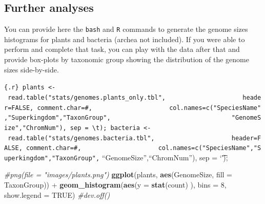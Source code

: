 \documentclass[10pt,a4paper,]{article}
\newenvironment{Shaded}{}{}
\newcommand{\CharTok}[1]{\textcolor[rgb]{0.25,0.44,0.63}{#1}}
\newcommand{\CommentTok}[1]{\textcolor[rgb]{0.38,0.63,0.69}{\textit{#1}}}
\newcommand{\DataTypeTok}[1]{\textcolor[rgb]{0.56,0.13,0.00}{#1}}
\newcommand{\DecValTok}[1]{\textcolor[rgb]{0.25,0.63,0.44}{#1}}
\newcommand{\KeywordTok}[1]{\textcolor[rgb]{0.00,0.44,0.13}{\textbf{#1}}}
\newcommand{\NormalTok}[1]{#1}
\newcommand{\OperatorTok}[1]{\textcolor[rgb]{0.40,0.40,0.40}{#1}}
\newcommand{\OtherTok}[1]{\textcolor[rgb]{0.00,0.44,0.13}{#1}}
\newcommand{\StringTok}[1]{\textcolor[rgb]{0.25,0.44,0.63}{#1}}
\begin{document}
\hypertarget{further-analyses}{%
\subsection{Further analyses}\label{further-analyses}}

You can provide here the \texttt{bash} and \texttt{R} commands to
generate the genome sizes histograms for plants and bacteria (archea not
included). If you were able to perform and complete that task, you can
play with the data after that and provide box-plots by taxonomic group
showing the distribution of the genome sizes side-by-side.

\begin{Shaded}
\end{Shaded}

\texttt{\{.r\}\ plants\ \textless{}-\ read.table("stats/genomes.plants\_only.tbl",\ \ \ \ \ \ \ \ \ \ \ \ \ \ \ \ \ \ \ \ \ header=FALSE,\ comment.char=\textquotesingle{}\#\textquotesingle{},\ \ \ \ \ \ \ \ \ \ \ \ \ \ \ \ \ \ \ \ \ col.names=c("SpeciesName","Superkingdom","TaxonGroup",\ \ \ \ \ \ \ \ \ \ \ \ \ \ \ \ \ \ \ \ \ \ \ \ \ \ \ \ \ \ \ \ \ "GenomeSize","ChromNum"),\ sep\ =\ \textquotesingle{}\textbackslash{}t\textquotesingle{});\ bacteria\ \textless{}-\ read.table("stats/genomes.bacteria.tbl",\ \ \ \ \ \ \ \ \ \ \ \ \ \ \ \ \ \ \ \ \ header=FALSE,\ comment.char=\textquotesingle{}\#\textquotesingle{},\ \ \ \ \ \ \ \ \ \ \ \ \ \ \ \ \ \ \ \ \ col.names=c("SpeciesName","Superkingdom","TaxonGroup",}
``GenomeSize'',``ChromNum''), sep = `\t');

\begin{Shaded}
\begin{Highlighting}[]
\CommentTok{#png(file = "images/plants.png")}
\KeywordTok{ggplot}\NormalTok{(plants, }\KeywordTok{aes}\NormalTok{(GenomeSize, }\DataTypeTok{fill =}\NormalTok{ TaxonGroup)) }\OperatorTok{+}\StringTok{ }\KeywordTok{geom_histogram}\NormalTok{(}\KeywordTok{aes}\NormalTok{(}\DataTypeTok{y =} \KeywordTok{stat}\NormalTok{(count) ), }\DataTypeTok{bins =} \DecValTok{8}\NormalTok{, }\DataTypeTok{show.legend =} \OtherTok{TRUE}\NormalTok{)}
\CommentTok{#dev.off()}
\end{Highlighting}
\end{Shaded}
\end{document}
